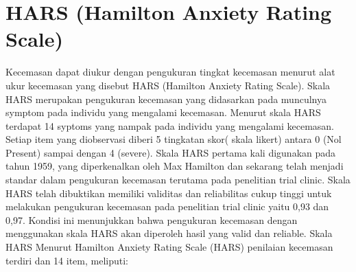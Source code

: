 \documentclass{jtetiproposalskripsi}
\begin{document}
\section{HARS (Hamilton Anxiety Rating Scale)}
Kecemasan dapat diukur dengan pengukuran tingkat kecemasan menurut alat ukur kecemasan yang disebut HARS (Hamilton Anxiety Rating Scale).  Skala HARS merupakan pengukuran kecemasan yang didasarkan pada munculnya symptom pada individu yang mengalami kecemasan. Menurut skala HARS terdapat 14 syptoms yang nampak pada individu yang mengalami kecemasan. Setiap item yang diobservasi diberi 5 tingkatan skor( skala likert) antara 0 (Nol Present) sampai dengan 4 (severe).
Skala HARS pertama kali digunakan pada tahun 1959, yang diperkenalkan oleh Max Hamilton dan sekarang telah menjadi standar dalam pengukuran kecemasan terutama pada penelitian trial clinic.  Skala HARS telah dibuktikan memiliki validitas dan reliabilitas cukup tinggi untuk melakukan pengukuran kecemasan pada penelitian trial clinic yaitu 0,93 dan 0,97. Kondisi ini menunjukkan bahwa pengukuran kecemasan dengan menggunakan skala HARS akan diperoleh hasil yang valid dan reliable.
Skala HARS Menurut Hamilton Anxiety Rating Scale (HARS)  penilaian kecemasan terdiri dan 14 item, meliputi:
\vspace{-0.5cm}
\end{document}
